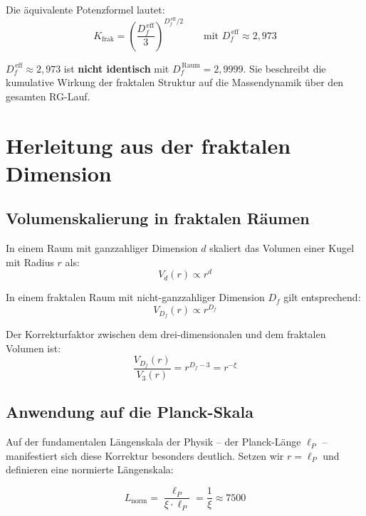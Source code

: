 	Die äquivalente Potenzformel lautet:
	\begin{equation}
		K_{\text{frak}} = \left(\frac{D_f^{\,\text{eff}}}{3}\right)^{\!D_f^{\,\text{eff}}/2} \qquad \text{mit } D_f^{\,\text{eff}} \approx 2{,}973
	\end{equation}
	
	$D_f^{\,\text{eff}} \approx 2{,}973$ ist \textbf{nicht identisch} mit $D_f^{\,\text{Raum}} = 2{,}9999$. Sie beschreibt die kumulative Wirkung der fraktalen Struktur auf die Massendynamik über den gesamten RG-Lauf.
	
	\section{Herleitung aus der fraktalen Dimension}
	
	\subsection{Volumenskalierung in fraktalen Räumen}
	
	In einem Raum mit ganzzahliger Dimension $d$ skaliert das Volumen einer Kugel mit Radius $r$ als:
	\begin{equation}
		V_d(r) \propto r^d
	\end{equation}
	
	In einem fraktalen Raum mit nicht-ganzzahliger Dimension $D_f$ gilt entsprechend:
	\begin{equation}
		V_{D_f}(r) \propto r^{D_f}
		\label{eq:fractal_volume}
	\end{equation}
	
	Der Korrekturfaktor zwischen dem drei-dimensionalen und dem fraktalen Volumen ist:
	\begin{equation}
		\frac{V_{D_f}(r)}{V_3(r)} = r^{D_f - 3} = r^{-\xi}
		\label{eq:volume_correction}
	\end{equation}
	
	\subsection{Anwendung auf die Planck-Skala}
	
	Auf der fundamentalen Längenskala der Physik – der Planck-Länge $\ell_P$ – manifestiert sich diese Korrektur besonders deutlich. Setzen wir $r = \ell_P$ und definieren eine normierte Längenskala:
	
	\begin{equation}
		L_{\text{norm}} = \frac{\ell_P}{\xi \cdot \ell_P} = \frac{1}{\xi} \approx 7500
	\end{equation}
	
